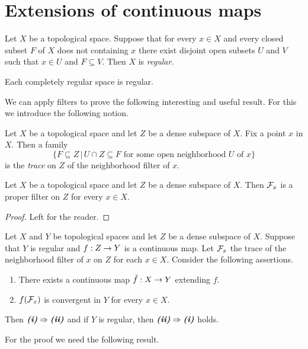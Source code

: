 \documentclass[10pt]{amsart}
\begin{document}
\section{Extensions of continuous maps}

\begin{definition}
	Let $X$ be a topological space. Suppose that for every $x \in X$ and every closed subset $F$ of $X$ does not containing $x$ there exist disjoint open subsets $U$ and $V$ such that $x \in U$ and $F \subseteq V$. Then $X$ is \textit{regular}.  
\end{definition}

\begin{corollary}\label{corollary:completely_regular_space_is_regular}
	Each completely regular space is regular.
\end{corollary}
\noindent
We can apply filters to prove the following interesting and useful result. For this we introduce the following notion.

\begin{definition}
	Let $X$ be a topological space and let $Z$ be a dense subspace of $X$. Fix a point $x$ in $X$. Then a family
	$$\big\{F\subseteq Z\,\big|\,U\cap Z\subseteq F\mbox{ for some open neighborhood }U\mbox{ of }x\big\}$$
is the \textit{trace} on $Z$ of the neighborhood filter of $x$. 
\end{definition}

\begin{fact}\label{fact:trace_is_proper_filter}
	Let $X$ be a topological space and let $Z$ be a dense subspace of $X$. Then ${\mathcal F}_x$ is a proper filter on $Z$ for every $x \in X$.   
\end{fact}
\begin{proof}
	Left for the reader.
\end{proof}

\begin{theorem}\label{theorem:extension_of_continuous_map_from_dense_subspace}
	Let $X$ and $Y$ be topological spaces and let $Z$ be a dense subspace of $X$. Suppose that $Y$ is regular and $f:Z\rightarrow Y$ is a continuous map. Let ${\mathcal F}_x$ the trace of the neighborhood filter of $x$ on $Z$ for each $x \in X$. Consider the following assertions.
	\begin{enumerate}[label=\emph{\textbf{(\roman*)}}, leftmargin=*]
		\item There exists a continuous map $\tilde{f}:X\rightarrow Y$ extending $f$.  
		\item $f({\mathcal F}_x)$ is convergent in $Y$ for every $x\in X$. 
	\end{enumerate}
	Then $\emph{\textbf{(i)}}\Rightarrow \emph{\textbf{(ii)}}$ and if $Y$ is regular, then $\emph{\textbf{(ii)}} \Rightarrow \emph{\textbf{(i)}}$ holds.
\end{theorem}
\noindent
For the proof we need the following result.
\end{document}
